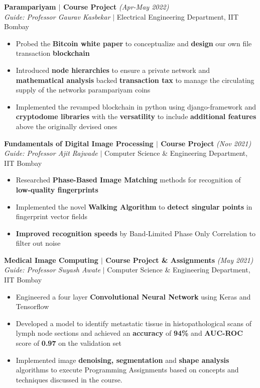 \documentclass[a4paper,11pt]{article}
\begin{document}
\textbf{Parampariyam $\mid$ Course Project} \hfill \emph{(Apr-May 2022)}\\
\emph{Guide: Professor Gaurav Kasbekar} $\mid$ Electrical Engineering Department, IIT Bombay
\vspace{-5pt}
\begin{itemize}[noitemsep]
    \item Probed the \textbf{Bitcoin white paper} to conceptualize and \textbf{design} our own file transaction \textbf{blockchain} 
    \item Introduced \textbf{node hierarchies} to ensure a private network and \textbf{mathematical analysis} backed \textbf{transaction tax} to manage the circulating supply of the networks parampariyam coins
    \item Implemented the revamped blockchain in python using django-framework and \textbf{cryptodome libraries} with the \textbf{versatility} to include \textbf{additional features} above the originally devised ones
\end{itemize}
\vspace{-3pt}

\textbf{Fundamentals of Digital Image Processing $\mid$ Course Project} \hfill \emph{(Nov 2021)}\\
\emph{Guide: Professor Ajit Rajwade} $\mid$ Computer Science \& Engineering Department, IIT Bombay
\vspace{-5pt}
\begin{itemize}[noitemsep]
    \item Researched \textbf{Phase-Based Image Matching} methods for recognition of \textbf{low-quality fingerprints}
    \item Implemented the novel \textbf{Walking Algorithm} to \textbf{detect singular points} in fingerprint vector fields
    \item \textbf{Improved recognition speeds} by Band-Limited Phase Only Correlation to filter out noise
\end{itemize}
\vspace{-3pt}

\textbf{Medical Image Computing $\mid$ Course Project \& Assignments} \hfill \emph{(May 2021)}\\
\emph{Guide: Professor Suyash Awate} $\mid$ Computer Science \& Engineering Department, IIT Bombay 
\vspace{-5pt}
\begin{itemize}[noitemsep]
    \item Engineered a four layer \textbf{Convolutional Neural Network} using Keras and Tensorflow
    \item Developed a model to identify metastatic tissue in histopathological scans of lymph node sections and achieved an \textbf{accuracy} of \textbf{94\%} and \textbf{AUC-ROC} score of \textbf{0.97} on the validation set
    \item Implemented image \textbf{denoising, segmentation} and \textbf{shape analysis} algorithms to execute Programming Assignments based on concepts and techniques discussed in the course.
\end{itemize}
\vspace{-3pt}
\end{document}
